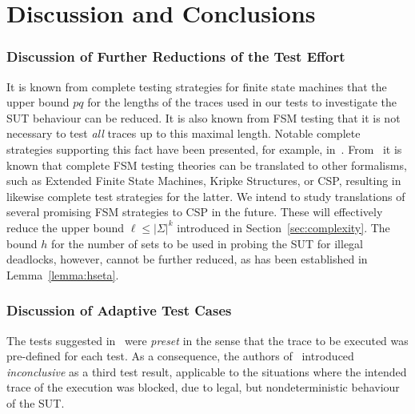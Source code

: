 \section{Discussion and Conclusions}
\label{sec:conc}

\subsubsection*{Discussion of Further Reductions of the Test Effort}
It is known from complete testing strategies for finite state machines that
the upper bound $pq$ for the lengths of the traces used in our tests to
investigate the SUT behaviour can be reduced. It is also known from FSM
testing that it is not necessary to test {\it all} traces up to this maximal
length. Notable complete strategies supporting this fact have been presented,
for example,
in~\cite{hierons_testing_2004,DBLP:conf/forte/DorofeevaEY05,petrenko_testing_2011,simao_reducing_2012}.
From~\cite{Huang2017} it is known that complete FSM testing theories can be
translated to other formalisms, such as Extended Finite State Machines,
Kripke Structures, or CSP, resulting in likewise complete test strategies for
the latter. We intend to study translations of several promising FSM
strategies to CSP in the future. These will effectively reduce the upper
bound $\ell\le |\Sigma|^k$ introduced in Section~\ref{sec:complexity}. The
bound $h$ for the number of sets to be used in probing the SUT for illegal
deadlocks, however, cannot be further reduced, as has been established in
Lemma~\ref{lemma:hseta}. 

\subsubsection*{Discussion of Adaptive Test Cases}
The tests suggested
in~\cite{Hennessy:1988:ATP:50497,DBLP:conf/icfem/CavalcantiG07} were \emph{preset} in the
sense that the trace to be executed was pre-defined for each test. As a consequence,
the authors of~\cite{DBLP:conf/icfem/CavalcantiG07} introduced \emph{inconclusive}
as a third test result, applicable to the situations where the intended trace
of the execution was blocked, due to legal, but nondeterministic behaviour of the
SUT.


